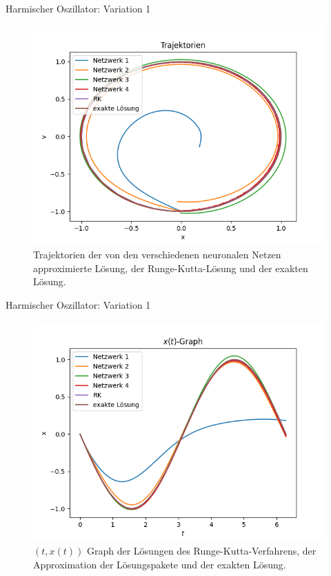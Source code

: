 \begin{frame}{Harmischer Oszillator: Variation 1}
    \begin{figure}
        \centering
        \includegraphics[scale=0.5]{images/harmonicoscillator_plots/harmonicoscillator_neurons_vartrajectories}
        \caption{Trajektorien der von den verschiedenen neuronalen Netzen approximierte Lösung, der Runge-Kutta-Lösung
        und der exakten Lösung.}
        \label{fig:harmonic-neurons-variable-trajectories}
    \end{figure}
\end{frame}

\begin{frame}{Harmischer Oszillator: Variation 1}
    \begin{figure}
        \centering
        \includegraphics[scale=0.5]{images/harmonicoscillator_plots/harmonicoscillator_neurons_vartrajectories_in_time_}
        \caption{$(t,x(t))$ Graph der Lösungen des Runge-Kutta-Verfahrens, der Approximation der
        Lösungspakete und der exakten Lösung.}
        \label{fig:harmonic-neurons-variable-trajectories-in-time}
    \end{figure}
\end{frame}

